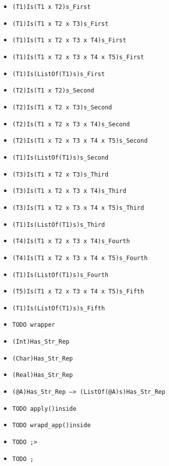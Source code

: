 \documentclass{article}
\begin{document}
\begin{itemize}
  \begin{itemize}
  \item \texttt{(T1)Is(T1 x T2)s_First}
  \item \texttt{(T1)Is(T1 x T2 x T3)s_First}
  \item \texttt{(T1)Is(T1 x T2 x T3 x T4)s_First}
  \item \texttt{(T1)Is(T1 x T2 x T3 x T4 x T5)s_First}
  \item \texttt{(T1)Is(ListOf(T1)s)s_First}
  \item \texttt{(T2)Is(T1 x T2)s_Second}
  \item \texttt{(T2)Is(T1 x T2 x T3)s_Second}
  \item \texttt{(T2)Is(T1 x T2 x T3 x T4)s_Second}
  \item \texttt{(T2)Is(T1 x T2 x T3 x T4 x T5)s_Second}
  \item \texttt{(T1)Is(ListOf(T1)s)s_Second}
  \item \texttt{(T3)Is(T1 x T2 x T3)s_Third}
  \item \texttt{(T3)Is(T1 x T2 x T3 x T4)s_Third}
  \item \texttt{(T3)Is(T1 x T2 x T3 x T4 x T5)s_Third}
  \item \texttt{(T1)Is(ListOf(T1)s)s_Third}
  \item \texttt{(T4)Is(T1 x T2 x T3 x T4)s_Fourth}
  \item \texttt{(T4)Is(T1 x T2 x T3 x T4 x T5)s_Fourth}
  \item \texttt{(T1)Is(ListOf(T1)s)s_Fourth}
  \item \texttt{(T5)Is(T1 x T2 x T3 x T4 x T5)s_Fifth}
  \item \texttt{(T1)Is(ListOf(T1)s)s_Fifth}
  \item \texttt{TODO wrapper}
  \item \texttt{(Int)Has_Str_Rep}
  \item \texttt{(Char)Has_Str_Rep}
  \item \texttt{(Real)Has_Str_Rep}
  \item \texttt{(@A)Has_Str_Rep --> (ListOf(@A)s)Has_Str_Rep}
  \item \texttt{TODO apply()inside}
  \item \texttt{TODO wrapd_app()inside}
  \item \texttt{TODO ;>}
  \item \texttt{TODO ;}
  \end{itemize}

\end{itemize}
\end{document}
